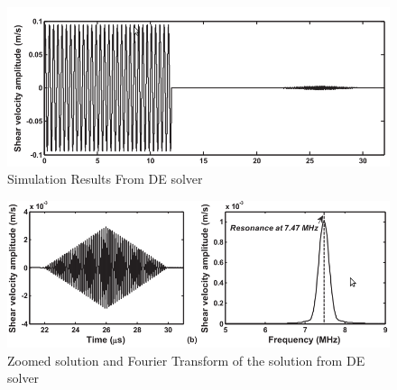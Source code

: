 \begin{figure}
\begin{center}
\includegraphics[scale=0.5]{images/chapter_3/validation.png}
\caption{Simulation Results From DE solver\cite{Liu}}
\end{center}
\end{figure}

\begin{figure}
\begin{center}
\includegraphics[scale=0.5]{images/chapter_3/validation_2.png}
\caption{Zoomed solution and Fourier Transform of the solution from DE solver \cite{Liu}}
\end{center}
\end{figure}